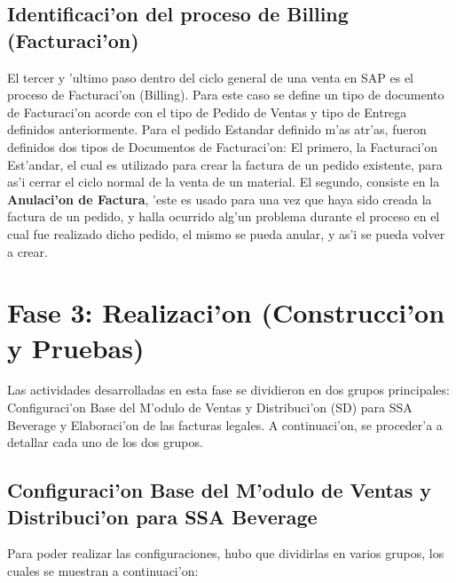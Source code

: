 \subsection{Identificaci'on del proceso de Billing (Facturaci'on)}
	El tercer y 'ultimo paso dentro del ciclo general de una venta en SAP es el proceso de Facturaci'on (Billing). Para este caso se define un tipo de documento de Facturaci'on acorde con el tipo de Pedido de Ventas y tipo de Entrega definidos anteriormente.
\newline
\newline
\indent Para el pedido Estandar definido m'as atr'as, fueron definidos dos tipos de Documentos de Facturaci'on: El primero, la Facturaci'on Est'andar, el cual es utilizado para crear la factura de un pedido existente, para as'i cerrar el ciclo normal de la venta de un material. El segundo, consiste en la \textbf{Anulaci'on de Factura}, 'este es usado para una vez que haya sido creada la factura de un pedido, y halla ocurrido alg'un problema durante el proceso en el cual fue realizado dicho pedido, el mismo se pueda anular, y as'i se pueda volver a crear.

\section{Fase 3: Realizaci'on (Construcci'on y Pruebas)}
	Las actividades desarrolladas en esta fase se dividieron en dos grupos principales: Configuraci'on Base del M'odulo de Ventas y Distribuci'on (SD) para SSA Beverage y Elaboraci'on de las facturas legales.
\newline
\newline
\indent A continuaci'on, se proceder'a a detallar cada uno de los dos grupos.
\subsection{Configuraci'on Base del M'odulo de Ventas y Distribuci'on para SSA Beverage}
	Para poder realizar las configuraciones, hubo que dividirlas en varios grupos, los cuales se muestran a continuaci'on:
